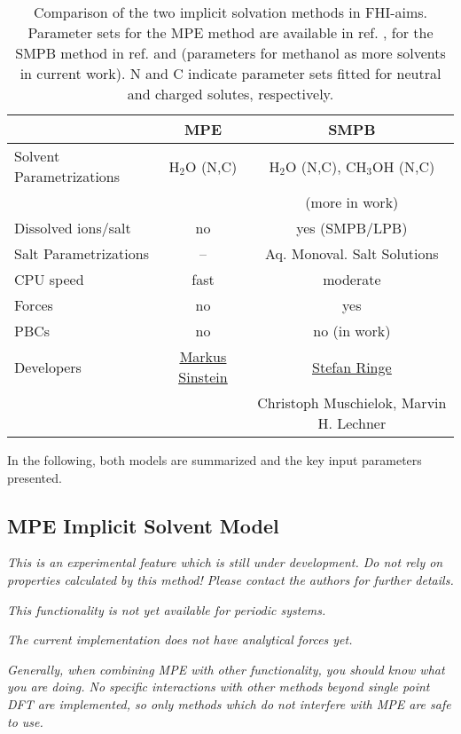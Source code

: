 \begin{table}[htb]
\centering
 \begin{tabular}{ l | c | c }
   & \textbf{MPE} & \textbf{SMPB}\\
  \hline		
  Solvent Parametrizations  & H$_2$O (N,C) & H$_2$O (N,C), CH$_3$OH (N,C)\\
    & & (more in work)\\
  Dissolved ions/salt & no & yes (SMPB/LPB)\\
  Salt Parametrizations & -- & Aq. Monoval. Salt Solutions\\
  CPU speed  & fast & moderate \\
  Forces & no & yes\\
  PBCs & no & no (in work)\\
  Developers	 & \href{markus.sinstein@mytum.de}{\underline{Markus Sinstein}} & \href{mailto:sringe@stanford.edu}{\underline{Stefan Ringe}}\\ 
  & & \small{Christoph Muschielok, Marvin H. Lechner} \\
  \hline  
\end{tabular}
 \caption{Comparison of the two implicit solvation methods in FHI-aims. Parameter sets for the MPE method are available in ref. \cite{Sinstein2017_MPE}, for the SMPB method in ref. \cite{Andreussi2012} and \cite{Dupont2013-bc} (parameters for methanol as more solvents in current work). N and C indicate parameter sets fitted for neutral and charged solutes, respectively.}
 \label{tab:ImpSolvMethods}
\end{table}

In the following, both models are summarized and the key input parameters presented.

\subsection{MPE Implicit Solvent Model}
\label{Sec:MultiPoleExpansion}

\emph{This is an experimental feature which is still under development. 
Do not rely on properties calculated by this method! 
Please contact the authors for further details.}

\emph{This functionality is not yet available for periodic systems.}

\emph{The current implementation does not have analytical forces yet.}

\emph{Generally, when combining MPE with other functionality, you should know what you are doing. No specific interactions with other methods beyond single point DFT are implemented, so only methods which do not interfere with MPE are safe to use.}

